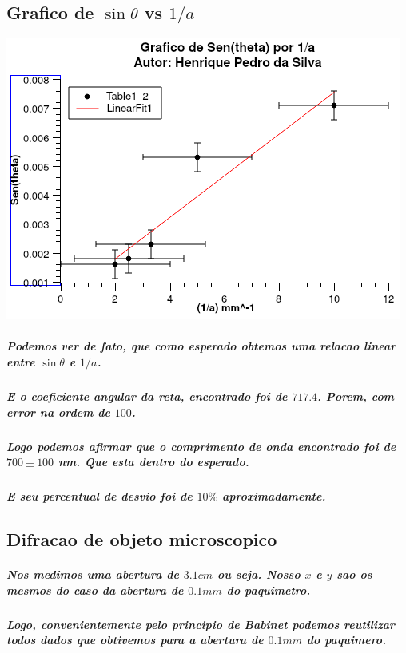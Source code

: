 \documentclass[12pt,twoside, a4paper, twocolumn]{article}
\begin{document}
\subsection{Grafico de $\sin{\theta}$ vs $1/a$}

\begin{adjustbox}{scale=0.70}
  \includegraphics{Graph1.png}
\end{adjustbox}

\subparagraph*{Podemos ver de fato, que como esperado obtemos uma relacao linear entre $\sin{\theta}$ e $1/a$.}

\subparagraph*{E o coeficiente angular da reta, encontrado foi de $717.4$. Porem, com error na ordem de $100$.}

\subparagraph*{Logo podemos afirmar que o comprimento de onda encontrado foi de $700 \pm 100$ nm. Que esta dentro do esperado.}

\subparagraph*{E seu percentual de desvio foi de $10\%$ aproximadamente.}

\pagebreak

\newpage

\subsection{Difracao de objeto microscopico}

\subparagraph*{Nos medimos uma abertura de $3.1cm$ ou seja. Nosso $x$ e $y$ sao os mesmos do caso da abertura de $0.1mm$ do paquimetro.}

\subparagraph*{Logo, convenientemente pelo principio de Babinet podemos reutilizar todos dados que obtivemos para a abertura de $0.1mm$ do paquimero.}
\end{document}
